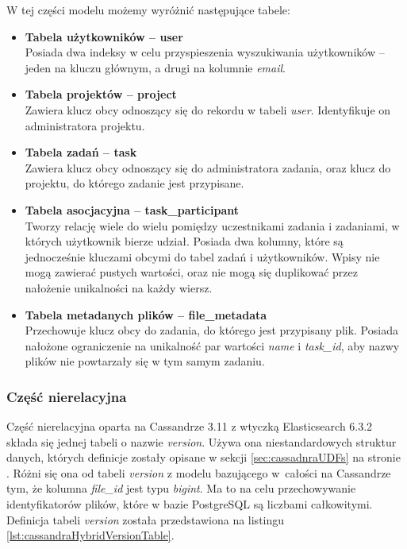 W tej części modelu możemy wyróżnić następujące tabele:
\begin{itemize}
    \item \textbf{Tabela użytkowników -- user} \\ 
    Posiada dwa indeksy w celu przyspieszenia wyszukiwania użytkowników -- jeden na kluczu głównym, a drugi na kolumnie \textit{email}.
    
    \item \textbf{Tabela projektów -- project} \\
    Zawiera klucz obcy odnoszący się do rekordu w tabeli \textit{user}. 
    Identyfikuje on administratora projektu.
    
    \item \textbf{Tabela zadań -- task} \\
    Zawiera klucz obcy odnoszący się do administratora zadania, oraz klucz do projektu, do którego zadanie jest przypisane.
    
    \item \textbf{Tabela asocjacyjna -- task\_participant} \\
    Tworzy relację wiele do wielu pomiędzy uczestnikami zadania i zadaniami, w których użytkownik bierze udział. 
    Posiada dwa kolumny, które są jednocześnie kluczami obcymi do tabel zadań i użytkowników. 
    Wpisy nie mogą zawierać pustych wartości, oraz nie mogą się duplikować przez nałożenie unikalności na każdy wiersz.
    
    \item \textbf{Tabela metadanych plików -- file\_metadata} \\
    Przechowuje klucz obcy do zadania, do którego jest przypisany plik.
    Posiada nałożone ograniczenie na unikalność par wartości \textit{name} i \textit{task\_id}, aby nazwy plików nie powtarzały się w tym samym zadaniu.
\end{itemize}

\subsubsection{Część nierelacyjna}

Część nierelacyjna oparta na Cassandrze 3.11 z wtyczką Elasticsearch 6.3.2 składa się jednej tabeli o nazwie \textit{version}.
Używa ona niestandardowych struktur danych, których definicje zostały opisane w sekcji \ref{sec:cassadnraUDFs} na stronie \pageref{sec:cassadnraUDFs}.
Różni się ona od tabeli \textit{version} z modelu bazującego w~całości na Cassandrze tym, że kolumna \textit{file\_id} jest typu \textit{bigint}.
Ma to na celu przechowywanie identyfikatorów plików, które w bazie PostgreSQL są liczbami całkowitymi.
Definicja tabeli \textit{version} została przedstawiona na listingu \ref{lst:cassandraHybridVersionTable}.

